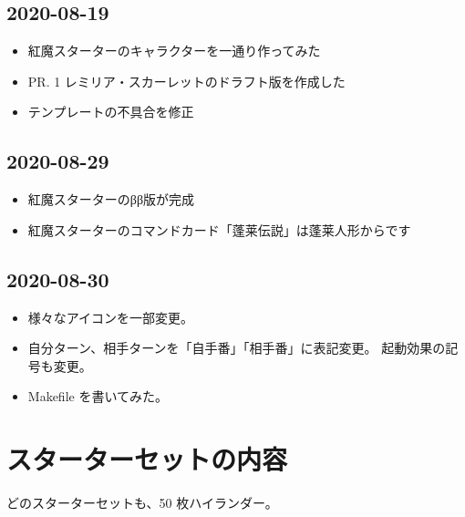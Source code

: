 \documentclass[line_length=22zw,number_of_lines=45,twocolumn]{jlreq}
\begin{document}
\subsection{2020-08-19}
\begin{itemize}
	\item 紅魔スターターのキャラクターを一通り作ってみた
	\item PR. 1 レミリア・スカーレットのドラフト版を作成した
	\item テンプレートの不具合を修正
\end{itemize}

\subsection{2020-08-29}
\begin{itemize}
	\item 紅魔スターターのββ版が完成
	\item 紅魔スターターのコマンドカード「蓬莱伝説」は蓬莱人形からです
\end{itemize}

\subsection{2020-08-30}
\begin{itemize}
	\item 様々なアイコンを一部変更。
	\item 自分ターン、相手ターンを「自手番」「相手番」に表記変更。
		起動効果の記号も変更。
	\item Makefile を書いてみた。
\end{itemize}

\section{スターターセットの内容}
どのスターターセットも、50 枚ハイランダー。
\clearpage\small
\end{document}
